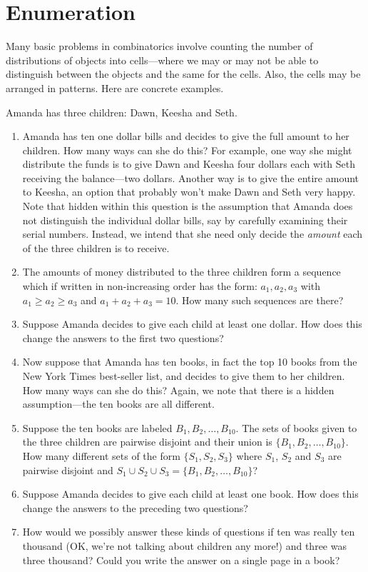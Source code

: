 \section{Enumeration}\label{s:intro:enum}

Many basic problems in combinatorics involve counting the
number of distributions of objects into cells---where we may
or may not be able to distinguish between the objects and the
same for the cells.  Also, the cells may be arranged in patterns.
Here are concrete examples.

Amanda has three children: \quad Dawn, Keesha and Seth.

\begin{enumerate}
\item Amanda has ten one dollar bills and decides to give the full
  amount to her children.  How many ways can she do this?  For
  example, one way she might distribute the funds is to give Dawn and
  Keesha four dollars each with Seth receiving the balance---two
  dollars.  Another way is to give the entire amount to Keesha, an
  option that probably won't make Dawn and Seth very happy.  Note that
  hidden within this question is the assumption that Amanda does not
  distinguish the individual dollar bills, say by carefully examining
  their serial numbers.  Instead, we intend that she need only
  decide the \textit{amount} each of the three children is to receive.
  
\item  The amounts of money distributed to the three children form a
sequence which if written in non-increasing order has the form:\quad
$a_1, a_2, a_3$ with $a_1\ge a_2\ge a_3$ and $a_1+a_2+a_3=10$.  How many
such sequences are there?
\item Suppose Amanda decides to give each child at least one dollar.  How
does this change the answers to the first two questions?
\item Now suppose that Amanda has ten books, in fact the top 10 books from the New
York Times best-seller list, and decides to give them to her
children.  How many ways can she do this?  Again, we note that there is
a hidden assumption---the ten books are all different.
\item Suppose the ten books are labeled $B_1, B_2,\dots, B_{10}$.
The sets of books given to the three children are pairwise disjoint and
their union is $\{B_1,B_2,\dots,B_{10}\}$.  How many different sets of 
the form $\{S_1, S_2, S_3\}$ where $S_1$, $S_2$ and $S_3$ are pairwise
disjoint and $S_1\cup S_2\cup S_3=\{B_1,B_2,\dots,B_{10}\}$?
\item Suppose Amanda decides to give each child at least one book.  How
does this change the answers to the preceding two questions?
\item How would we possibly answer these kinds of questions if ten 
was really ten thousand (OK, we're not talking about children any more!)
and three was three thousand?  Could you write the answer on a single
page in a book?
\end{enumerate}

